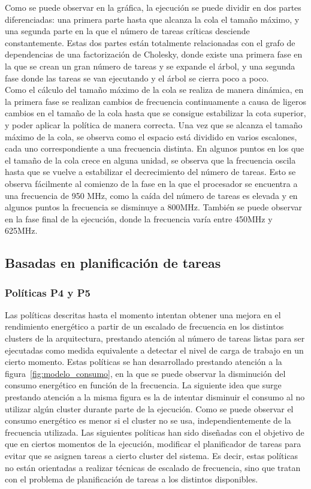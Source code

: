 Como se puede observar en la gráfica, la ejecución se puede dividir en dos
partes diferenciadas: una primera parte hasta que alcanza la cola el tamaño
máximo, y una segunda parte en la que el número de tareas críticas
desciende constantemente. Estas dos partes están totalmente relacionadas
con el grafo de dependencias de una factorización de Cholesky, donde existe
una primera fase en la que se crean un gran número de tareas y se expande
el árbol, y una segunda fase donde las tareas se van ejecutando y el árbol
se cierra poco a poco.\\
Como el cálculo del tamaño máximo de la cola se realiza de manera dinámica,
en la primera fase se realizan cambios de frecuencia continuamente a causa
de ligeros cambios en el tamaño de la cola hasta que se consigue
estabilizar la cota superior, y poder aplicar la política de manera
correcta. Una vez que se alcanza el tamaño máximo de la cola, se observa
como el espacio está dividido en varios escalones, cada uno correspondiente
a una frecuencia distinta. En algunos puntos en los que el tamaño de la
cola crece en alguna unidad, se observa que la frecuencia oscila hasta que
se vuelve a estabilizar el decrecimiento del número de tareas. Esto se
observa fácilmente al comienzo de la fase en la que el procesador se
encuentra a una frecuencia de 950 MHz, como la caída del número de tareas
es elevada y en algunos puntos la frecuencia se disminuye a 800MHz. También
se puede observar en la fase final de la ejecución, donde la frecuencia
varía entre 450MHz y 625MHz.

\subsection[Basadas en planificación de tareas (P4, P5 y P6)]{Basadas en planificación de tareas}
\subsubsection{Políticas P4 y P5}
Las políticas descritas hasta el momento intentan obtener una mejora en el
rendimiento energético a partir de un escalado de frecuencia en los
distintos clusters de la arquitectura, prestando atención al número de
tareas listas para ser ejecutadas como medida equivalente a detectar el
nivel de carga de trabajo en un cierto momento. Estas políticas se han
desarrollado prestando atención a la figura~\ref{fig:modelo_consumo}, en la
que se puede observar la disminución del consumo energético en función de
la frecuencia. La siguiente idea que surge prestando atención a la misma
figura es la de intentar disminuir el consumo al no utilizar algún cluster
durante parte de la ejecución. Como se puede observar el consumo energético
es menor si el cluster no se usa, independientemente de la frecuencia
utilizada. Las siguientes políticas han sido diseñadas con el objetivo de
que en ciertos momentos de la ejecución, modificar el planificador de
tareas para evitar que se asignen tareas a cierto cluster del sistema. Es
decir, estas políticas no están orientadas a realizar técnicas de escalado
de frecuencia, sino que tratan con el
problema de planificación de tareas a los distintos \wts disponibles.\\

